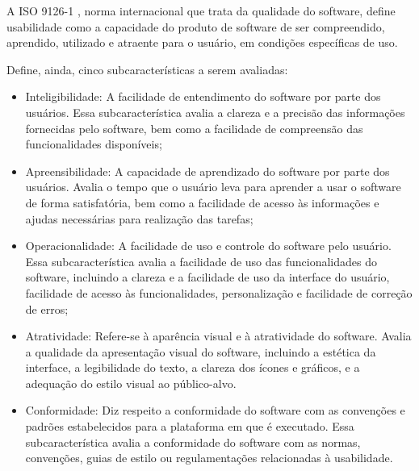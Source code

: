 A ISO 9126-1 \cite{iso9126}, norma internacional que trata da qualidade do software, 
define usabilidade como a capacidade do produto de software de ser compreendido, 
aprendido, utilizado e atraente para o usuário, em condições específicas de uso. 
\begin{description}
    \item Define, ainda, cinco subcaracterísticas a serem avaliadas:
          \begin{itemize}
              \item Inteligibilidade: A facilidade de entendimento do software por parte dos usuários. Essa 
              subcaracterística avalia a clareza e a precisão das informações fornecidas pelo software, bem 
              como a facilidade de compreensão das funcionalidades disponíveis;

              \item Apreensibilidade: A capacidade de aprendizado do software por parte dos usuários. Avalia 
              o tempo que o usuário leva para aprender a usar o software de forma satisfatória, bem como a 
                facilidade de acesso às informações e ajudas necessárias para realização das tarefas;

              \item Operacionalidade: A facilidade de uso e controle do software pelo usuário. Essa subcaracterística 
              avalia a facilidade de uso das funcionalidades do software, incluindo a clareza e a facilidade de uso 
              da interface do usuário, facilidade de acesso às funcionalidades, personalização e facilidade de 
              correção de erros;

              \item Atratividade: Refere-se à aparência visual e à atratividade do software. Avalia a qualidade da 
              apresentação visual do software, incluindo a estética da interface, a legibilidade do texto, a clareza 
              dos ícones e gráficos, e a adequação do estilo visual ao público-alvo.

              \item Conformidade: Diz respeito a conformidade do software com as convenções e padrões estabelecidos para 
              a plataforma em que é executado. Essa subcaracterística avalia a conformidade do software com as normas, 
              convenções, guias de estilo ou regulamentações relacionadas à usabilidade.
          \end{itemize}
\end{description}


